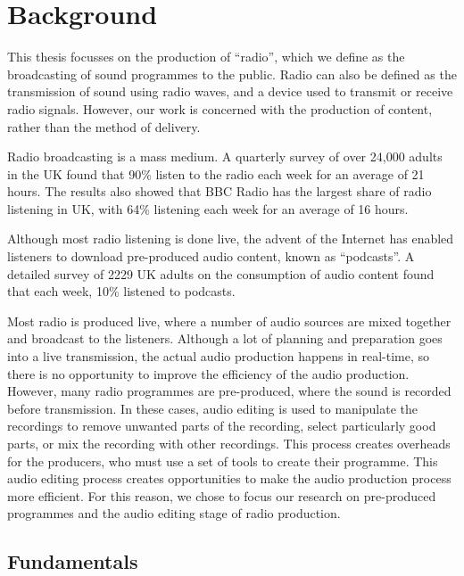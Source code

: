 \chapter{Background}\label{chp:background}

This thesis focusses on the production of ``radio'', which we define as the broadcasting of sound programmes to the
public.  Radio can also be defined as the transmission of sound using radio waves, and a device used to transmit or
receive radio signals.  However, our work is concerned with the production of content, rather than the method of
delivery.

Radio broadcasting is a mass medium.  A quarterly survey of over 24,000 adults in the UK \citep{RAJAR2017a} found that
90\% listen to the radio each week for an average of 21 hours. The results also showed that BBC Radio has the largest
share of radio listening in UK, with 64\% listening each week for an average of 16 hours.

Although most radio listening is done live, the advent of the Internet has enabled listeners to download pre-produced
audio content, known as ``podcasts''. A detailed survey of 2229 UK adults on the consumption of audio content
\citep{RAJAR2017} found that each week, 10\% listened to podcasts. 

Most radio is produced live, where a number of audio sources are mixed together and broadcast to the listeners.
Although a lot of planning and preparation goes into a live transmission, the actual audio production happens in
real-time, so there is no opportunity to improve the efficiency of the audio production. However, many radio programmes
are pre-produced, where the sound is recorded before transmission.  In these cases, audio editing is used to manipulate
the recordings to remove unwanted parts of the recording, select particularly good parts, or mix the recording with
other recordings. This process creates overheads for the producers, who must use a set of tools to create their
programme. This audio editing process creates opportunities to make the audio production process more efficient. For
this reason, we chose to focus our research on pre-produced programmes and the audio editing stage of radio production.

\section{Fundamentals}


